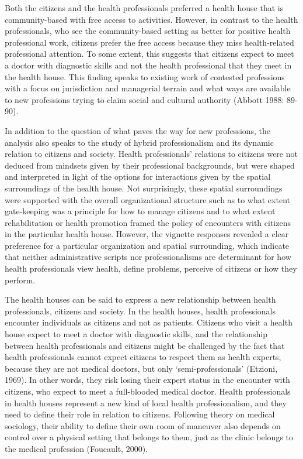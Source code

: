 \par
Both the citizens and the health professionals preferred a health house that is community-based with free access to activities. However, in contrast to the health professionals, who see the community-based setting as better for positive health professional work, citizens prefer the free access because they miss health-related professional attention. To some extent, this suggests that citizens expect to meet a doctor with diagnostic skills and not the health professional that they meet in the health house. This finding speaks to existing work of contested professions with a focus on jurisdiction and managerial terrain and what ways are available to new professions trying to claim social and cultural authority (Abbott 1988: 89-90).
\par
In addition to the question of what paves the way for new professions, the analysis also speaks to the study of hybrid professionalism and its dynamic relation to citizens and society. Health professionals’ relations to citizens were not deduced from mindsets given by their professional backgrounds, but were shaped and interpreted in light of the options for interactions given by the spatial surroundings of the health house. Not surprisingly, these spatial surroundings were supported with the overall organizational structure such as to what extent gate-keeping was a principle for how to manage citizens and to what extent rehabilitation or health promotion framed the policy of encounters with citizens in the particular health house. However, the vignette responses revealed a clear preference for a particular organization and spatial surrounding, which indicate that neither administrative scripts nor professionalisms are determinant for how health professionals view health, define problems, perceive of citizens or how they perform.
\par
The health houses can be said to express a new relationship between health professionals, citizens and society. In the health houses, health professionals encounter individuals as citizens and not as patients. Citizens who visit a health house expect to meet a doctor with diagnostic skills, and the relationship between health professionals and citizens might be challenged by the fact that health professionals cannot expect citizens to respect them as health experts, because they are not medical doctors, but only ‘semi-professionals’ (Etzioni, 1969). In other words, they risk losing their expert status in the encounter with citizens, who expect to meet a full-blooded medical doctor. Health professionals in health houses represent a new kind of local health professionalism, and they need to define their role in relation to citizens. Following theory on medical sociology, their ability to define their own room of maneuver also depends on control over a physical setting that belongs to them, just as the clinic belongs to the medical profession (Foucault, 2000).
